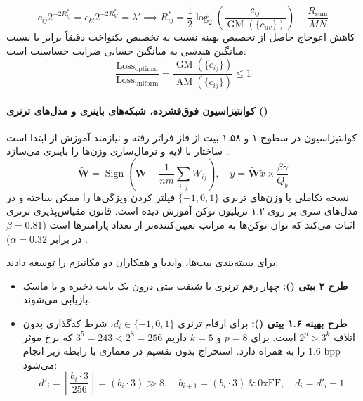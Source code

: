 \begin{enumerate}
    \begin{equation}
        c_{ij} 2^{-2R_{ij}^*} = c_{kl} 2^{-2R_{kl}^*} = \lambda' \implies R_{ij}^* = \frac{1}{2} \log_2\left(\frac{c_{ij}}{\operatorname{GM}(\{c_{uv}\})}\right) + \frac{R_{\text{sum}}}{MN}
    \end{equation}
    کاهش اعوجاج حاصل از تخصیص بهینه نسبت به تخصیص یکنواخت دقیقاً برابر با نسبت میانگین هندسی به میانگین حسابی ضرایب حساسیت است:
    \begin{equation}
        \frac{\text{Loss}_{\text{optimal}}}{\text{Loss}_{\text{uniform}}} = \frac{\operatorname{GM}(\{c_{ij}\})}{\operatorname{AM}(\{c_{ij}\})} \le 1
    \end{equation}
\end{enumerate}

\paragraph*{کوانتیزاسیون فوق‌فشرده، شبکه‌های باینری و مدل‌های ترنری ()}
کوانتیزاسیون در سطوح ۱ و ۱.۵۸ بیت از فاز  فراتر رفته و نیازمند آموزش از ابتدا است \cite{liu2025binary}. ساختار  \cite{wang2023bitnet} با لایه  و نرمال‌سازی  وزن‌ها را باینری می‌سازد:
\begin{equation}
    \widetilde{\mathbf{W}} = \operatorname{Sign}\left(\mathbf{W} - \frac{1}{nm}\sum_{i,j} W_{ij}\right), \quad y = \widetilde{\mathbf{W}} \widetilde{x} \times \frac{\beta \gamma}{Q_b}
\end{equation}
نسخه تکاملی  \cite{ma2024era} با وزن‌های ترنری $\{-1, 0, 1\}$ فیلتر کردن ویژگی‌ها را ممکن ساخته و در مدل‌های سری  \cite{vaidhya2025spectra} بر روی ۱.۲ تریلیون توکن آموزش دیده است. قانون مقیاس‌پذیری ترنری اثبات می‌کند که توان توکن‌ها به مراتب تعیین‌کننده‌تر از تعداد پارامترها است ($\beta = 0.81$ در برابر $\alpha = 0.32$) \cite{vaidhya2025spectra}.

برای بسته‌بندی بیت‌ها، وایدیا و همکاران \cite{vaidhya2025spectra} دو مکانیزم را توسعه دادند:
\begin{itemize}
    \item \textbf{طرح ۲ بیتی ():} چهار رقم ترنری با شیفت بیتی درون یک بایت ذخیره و با ماسک  بازیابی می‌شوند.
    \item \textbf{طرح بهینه ۱.۶ بیتی ():} برای ارقام ترنری $d_i \in \{-1, 0, 1\}$، شرط کدگذاری بدون اتلاف $2^p > 3^k$ است. برای $p=8$ و $k=5$ داریم $3^5 = 243 < 2^8 = 256$ که نرخ موثر $1.6\text{ bpp}$ را به همراه دارد. استخراج بدون تقسیم در معماری  با رابطه زیر انجام می‌شود:
    \begin{equation}
        d'_i = \left\lfloor \frac{b_i \cdot 3}{256} \right\rfloor = (b_i \cdot 3) \gg 8, \quad b_{i+1} = (b_i \cdot 3) \ \& \ 0\text{xFF}, \quad d_i = d'_i - 1
    \end{equation}
\end{itemize}

